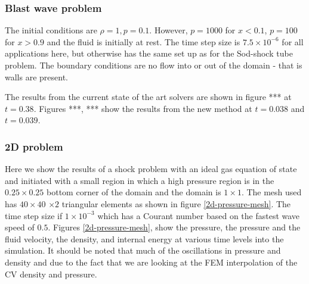 \subsubsection{Blast wave problem} 


The initial conditions are $\rho=1, p=0.1$. 
However, $p=1000$ for $x< 0.1$, $p=100$ for $x> 0.9$ and the fluid 
is initially at rest. 
The time step size is $7.5\times10^{-6}$ for all applications 
here, but otherwise has the same set up as for the Sod-shock tube problem.
The boundary conditions are no flow into or out of the domain - that is 
walls are present. 

The results from the current state of the art solvers are shown 
in figure *** at $t=0.38$. Figures ***, *** show the results 
from the new method at $t=0.038$ and $t=0.039$. 



\subsubsection{2D problem}
Here we show the results of a shock problem with 
an ideal gas equation of state and initiated with 
a small region in which a high pressure region is 
in the $0.25\times0.25$ bottom corner of the 
domain and the domain is $1\times 1$. The 
mesh used has $40\times40$ $\times 2$ triangular elements 
as shown in figure \ref{2d-pressure-mesh}. 
The time step size if $1\times 10^{-3}$ which has a 
Courant number based on the fastest wave speed of $0.5$. 
Figures \ref{2d-pressure-mesh}, 
show the pressure, the pressure and the fluid velocity, 
the density, and internal energy at various time levels 
into the simulation. It should be noted that much of the oscillations 
in pressure and density and due to the fact that we are 
looking at the FEM interpolation of the CV density and pressure. 



